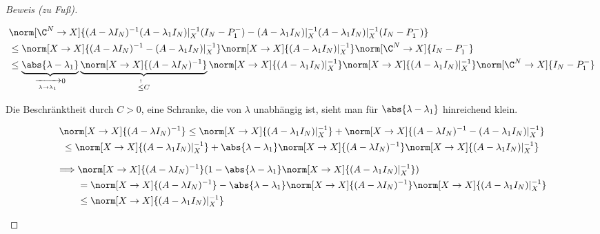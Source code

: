 \begin{proof}[Beweis (zu Fuß)]
\begin{enumerate}[label = (\roman*)]
        \begin{align*}
            &
            \norm[\C^N \to X]
            {
                (A - \lambda I_N)^{-1}
                (A - \lambda_1 I_N) |_X^{-1}
                (I_N - P_1^-)
                -
                (A - \lambda_1 I_N) |_X^{-1}
                (A - \lambda_1 I_N) |_X^{-1}
                (I_N - P_1^-)
            } \\
            & \leq
            \norm[X \to X]
            {
                (A - \lambda I_N)^{-1}
                -
                (A - \lambda_1 I_N) |_X^{-1}
            }
            \norm[X \to X]{(A - \lambda_1 I_N) |_X^{-1}}
            \norm[\C^N \to X]{I_N - P_1^-} \\
            & \leq
            \underbrace
            {
                \abs{\lambda - \lambda_1}
            }_{
                \xrightarrow[\lambda \to \lambda_1]{} 0
            }
            \underbrace
            {
                \norm[X \to X]{(A - \lambda I_N)^{-1}}
            }_{
                \stackrel{!}{\leq} C
            }
            \norm[X \to X]{(A - \lambda_1 I_N) |_X^{-1}}
            \norm[X \to X]{(A - \lambda_1 I_N) |_X^{-1}}
            \norm[\C^N \to X]{I_N - P_1^-}
        \end{align*}

        Die Beschränktheit durch $C > 0$, eine Schranke, die von $\lambda$ unabhängig ist, sieht man für $\abs{\lambda - \lambda_1}$ hinreichend klein.

        \begin{multline*}
            \norm[X \to X]{(A - \lambda I_N)^{-1}}
            \leq
            \norm[X \to X]{(A - \lambda_1 I_N) |_X^{-1}}
            +
            \norm[X \to X]
            {
                (A - \lambda I_N)^{-1}
                -
                (A - \lambda_1 I_N) |_X^{-1}
            } \\
            \leq
            \norm[X \to X]{(A - \lambda_1 I_N) |_X^{-1}}
            +
            \abs{\lambda - \lambda_1}
            \norm[X \to X]{(A - \lambda I_N)^{-1}}
            \norm[X \to X]{(A - \lambda_1 I_N) |_X^{-1}}           
        \end{multline*}

        \begin{align*}
            \implies
            &
            \norm[X \to X]{(A - \lambda I_N)^{-1}}
            (
                1
                -
                \abs{\lambda - \lambda_1}
                \norm[X \to X]{(A - \lambda_1 I_N) |_X^{-1}}
            ) \\
            & =
            \norm[X \to X]{(A - \lambda I_N)^{-1}}
            -
            \abs{\lambda - \lambda_1}
            \norm[X \to X]{(A - \lambda I_N)^{-1}}
            \norm[X \to X]{(A - \lambda_1 I_N) |_X^{-1}} \\
            & \leq
            \norm[X \to X]{(A - \lambda_1 I_N) |_X^{-1}}
        \end{align*}


\end{enumerate}
\end{proof}

